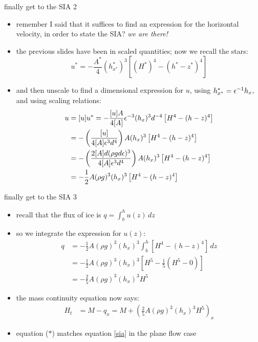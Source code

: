 \begin{frame}{finally get to the SIA 2}

\small
\begin{itemize}
\item remember I said that it suffices to find an expression for the horizontal velocity, in order to state the SIA?  \quad \emph{we are there!}
\item the previous slides have been in scaled quantities; now we recall the stars:
   $$u^* = -\frac{A^*}{4} (h^*_{x^*})^3 \left[(H^*)^4 - (h^* - z^*)^4\right]$$
\item and then unscale to find a dimensional expression for $u$, using $h^*_{x^*} = \epsilon^{-1} h_x$, and using scaling relations:
\begin{align*}
u &= [u] u^* = -\frac{[u] A}{4 [A]} \epsilon^{-3} (h_x)^3 d^{-4} \left[H^4 - (h - z)^4\right] \\
  &= - \left(\frac{[u]}{4 [A] \epsilon^3 d^4}\right) A (h_x)^3 \left[H^4 - (h - z)^4\right] \\
  &= - \left(\frac{2 [A] d (\rho g d \epsilon)^3}{4 [A] \epsilon^3 d^4}\right) A (h_x)^3 \left[H^4 - (h - z)^4\right] \\
  &= - \frac{1}{2} A (\rho g)^3 (h_x)^3 \left[H^4 - (h - z)^4\right]
\end{align*}
\end{itemize}
\end{frame}


\begin{frame}{finally get to the SIA 3}

\begin{itemize}
\item recall that the flux of ice is $q = \int_b^h u(z) \,dz$
\item so we integrate the expression for $u(z)$:
\begin{align*}
q &= -\frac{1}{2} A (\rho g)^3 (h_x)^3 \int_b^h \left[H^4 - (h - z)^4\right]\,dz \\
  &= -\frac{1}{2} A (\rho g)^3 (h_x)^3 \left[H^5 - \frac{1}{5}(H^5 - 0)\right] \\
  &= -\frac{2}{5} A (\rho g)^3 (h_x)^3 H^5
\end{align*}
\item the mass continuity equation now says:
\begin{align*}
H_t &= M - q_x = M + \left(\frac{2}{5} A (\rho g)^3 (h_x)^3 H^5\right)_x \tag{$\ast$}
\end{align*}
\item equation ($\ast$) matches equation \eqref{sia} in the plane flow case
\end{itemize}
\end{frame}



